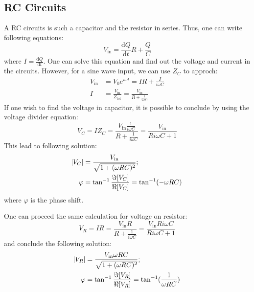 \documentclass[aps,prl,reprint]{revtex4-1}
\newcommand{\de}{\mathrm{d}}
\begin{document}
    \subsection{RC Circuits}
        A RC circuits is such a capacitor and the resistor in series. Thus, one can write following equations:
        \begin{equation}
            V_\text{in} = \frac{\de Q}{\de t} R + \frac{Q}{C}\label{eq:diffeq}
        \end{equation}
        where $I = \frac{\de Q}{\de t}$. One can solve this equation and find out the voltage and current in the circuits. However, for a sine wave input, we can use $Z_C$ to approch:
        \begin{align*}
            V_\text{in} &= V_0 e^{i \omega t} = IR + \frac{I}{i \omega C} \\
            I &= \frac{V_\text{in}}{Z_\text{tot}} = \frac{V_\text{in}}{R + \frac{1}{i \omega C}}
        \end{align*}
        If one wish to find the voltage in capacitor, it is possible to conclude by using the voltage divider equation:
        \[
        V_C = I Z_C = \frac{V_\text{in} \frac{1}{i\omega C}}{R + \frac{1}{i \omega C}} = \frac{V_\text{in} }{R i \omega C + 1}
        \]
        This lead to following solution:
        \begin{align}
            \abs{V_C} &= \frac{V_\text{in}}{\sqrt{1 + (\omega R C)^2}}; \nonumber\\
            \varphi &= \tan^{-1} \frac{\Im[V_C]}{\Re[V_C]} = \tan^{-1} (-\omega R C) \label{eq:lowpass}
        \end{align}
        where $\varphi$ is the phase shift.

        One can proceed the same calculation for voltage on resistor:
        \[
        V_R = I R =  \frac{V_\text{in} R}{R + \frac{1}{i \omega C}} = \frac{V_\text{in} R i \omega C}{R i \omega C + 1}
        \]
        and conclude the following solution:
        \begin{align}
            \abs{V_R} &= \frac{V_\text{in} \omega R C}{\sqrt{1 + (\omega R C)^2}} ; \nonumber\\
            \varphi &= \tan^{-1} \frac{\Im[V_R]}{\Re[V_R]} = \tan^{-1} (\frac{1}{\omega R C})\label{eq:highpass}
        \end{align}
\end{document}
